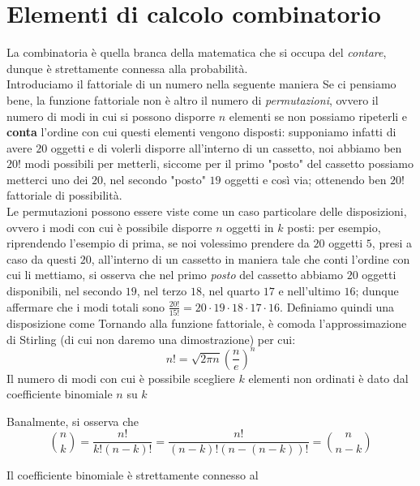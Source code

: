 \documentclass{report}
\begin{document}
	\section{Elementi di calcolo combinatorio}
	La combinatoria è quella branca della matematica che si occupa del \emph{contare}, dunque è strettamente connessa alla probabilità. \\
	Introduciamo il fattoriale di un numero nella seguente maniera
\noindent Se ci pensiamo bene, la funzione fattoriale non è altro il numero di \emph{permutazioni}, ovvero il numero di modi in cui si possono disporre $n$ elementi se non possiamo ripeterli e \textbf{conta} l'ordine con cui questi elementi vengono disposti: supponiamo infatti di avere $20$ oggetti e di volerli disporre all'interno di un cassetto, noi abbiamo ben $20!$ modi possibili per metterli, siccome per il primo "posto" del cassetto possiamo metterci uno dei $20$, nel secondo "posto" $19$ oggetti e così via; ottenendo ben $20!$ fattoriale di possibilità. \\
	Le permutazioni possono essere viste come un caso particolare delle disposizioni, ovvero i modi con cui è possibile disporre $n$ oggetti in $k$ posti: per esempio, riprendendo l'esempio di prima, se noi volessimo prendere da $20$ oggetti $5$, presi a caso da questi $20$, all'interno di un cassetto in maniera tale che conti l'ordine con cui li mettiamo, si osserva che nel primo \emph{posto} del cassetto abbiamo $20$ oggetti disponibili, nel secondo $19$, nel terzo $18$, nel quarto $17$ e nell'ultimo $16$; dunque affermare che i modi totali sono $\frac{20!}{15!} = 20 \cdot 19 \cdot 18 \cdot 17 \cdot 16$. Definiamo quindi una disposizione come
\noindent Tornando alla funzione fattoriale, è comoda l'approssimazione di Stirling (di cui non daremo una dimostrazione) per cui:
\begin{equation}
	n! = \sqrt{2\pi n} \left( \frac{n}{e} \right)^n
\end{equation}
Il numero di modi con cui è possibile scegliere  $k$ elementi non ordinati è dato dal coefficiente binomiale $n$ su $k$
\begin{myproof}
	Banalmente, si osserva che
	$$
		\binom{n}{k} = \frac{n!}{k!(n-k)!} = \frac{n!}{(n-k)!(n-(n-k))!} = \binom{n}{n-k}
	$$
\end{myproof}
\noindent Il coefficiente binomiale è strettamente connesso al 
\end{document}
